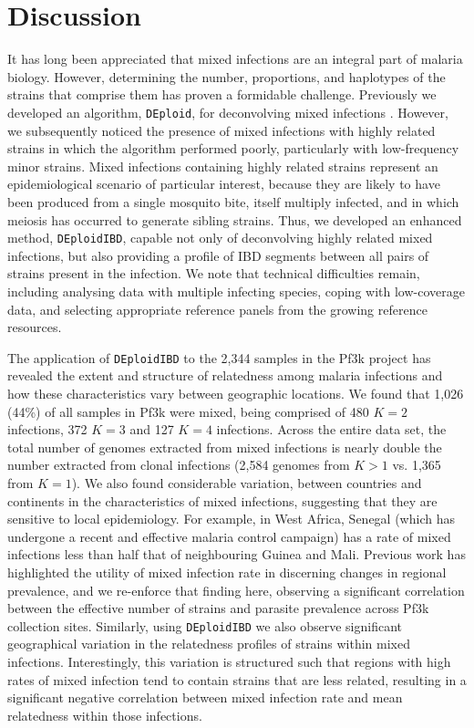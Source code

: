 \documentclass[9pt,lineno]{elife}
\begin{document}
\section{Discussion}

It has long been appreciated that mixed infections are an integral part of malaria biology.  However, determining the number, proportions, and haplotypes of the strains that comprise them has proven a formidable challenge.  Previously we developed an algorithm, \texttt{DEploid}, for deconvolving mixed infections \citep{Zhu2017}.  However, we subsequently noticed the presence of mixed infections with highly related strains in which the algorithm performed poorly, particularly with low-frequency minor strains.  Mixed infections containing highly related strains represent an epidemiological scenario of particular interest, because  they are likely to have been produced from a single mosquito bite, itself multiply infected, and in which meiosis has occurred to generate sibling strains. Thus, we developed an enhanced method, \texttt{DEploidIBD}, capable not only of deconvolving highly related mixed infections, but also providing a profile of IBD segments between all pairs of strains present in the infection.  We note that technical difficulties remain, including analysing data with multiple infecting species, coping with low-coverage data, and selecting appropriate reference panels from the growing reference resources.

The application of \texttt{DEploidIBD} to the 2,344 samples in the Pf3k project has revealed the extent and structure of relatedness among malaria infections and how these characteristics vary between geographic locations. We found that 1,026 (44\%) of all samples in Pf3k were mixed, being comprised of 480 $K=2$ infections, 372 $K=3$ and 127 $K=4$ infections. Across the entire data set, the total number of genomes extracted from mixed infections is nearly double the number extracted from clonal infections (2,584 genomes from $K>1$ vs. 1,365 from $K=1$).  We also found considerable variation, between countries and continents in the characteristics of mixed infections, suggesting that they are sensitive to local epidemiology.  For example, in West Africa, Senegal (which has undergone a recent and effective malaria control campaign) has a rate of mixed infections less than half that of neighbouring Guinea and Mali.  Previous work has highlighted the utility of mixed infection rate in discerning changes in regional prevalence, and we re-enforce that finding here, observing a significant correlation between the effective number of strains and parasite prevalence across Pf3k collection sites. Similarly, using \texttt{DEploidIBD} we also observe significant geographical variation in the relatedness profiles of strains within mixed infections.  Interestingly, this variation is structured such that regions with high rates of mixed infection tend to contain strains that are less related, resulting in a significant negative correlation between mixed infection rate and mean relatedness within those infections.
\end{document}
